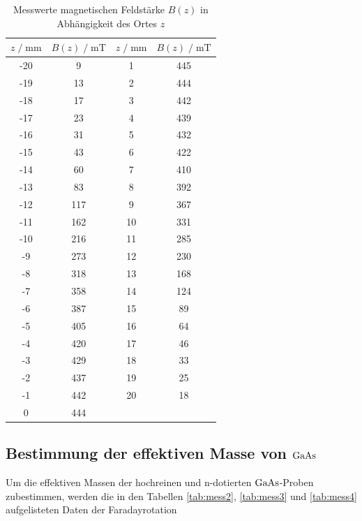 \begin{table}[H]
    \centering
    \caption{Messwerte magnetischen Feldstärke $B(z)$ in Abhängigkeit des Ortes $z$}
    \label{tab:mess1}
    \begin{tabular}{c c c c}
    \toprule
    $z \;/\; \si{\milli\meter}$ & $B(z) \;/\; \si{\milli\tesla}$ & $z \;/\; \si{\milli\meter}$ & $B(z) \;/\; \si{\milli\tesla}$ \\
    \midrule
        -20 &   9 &  1 & 445 \\
        -19 &  13 &  2 & 444 \\
        -18 &  17 &  3 & 442 \\
        -17 &  23 &  4 & 439 \\
        -16 &  31 &  5 & 432 \\
        -15 &  43 &  6 & 422 \\
        -14 &  60 &  7 & 410 \\
        -13 &  83 &  8 & 392 \\
        -12 & 117 &  9 & 367 \\
        -11 & 162 & 10 & 331 \\
        -10 & 216 & 11 & 285 \\
         -9 & 273 & 12 & 230 \\
         -8 & 318 & 13 & 168 \\
         -7 & 358 & 14 & 124 \\
         -6 & 387 & 15 &  89 \\
         -5 & 405 & 16 &  64 \\
         -4 & 420 & 17 &  46 \\
         -3 & 429 & 18 &  33 \\ 
         -2 & 437 & 19 &  25 \\ 
         -1 & 442 & 20 &  18 \\ 
          0 & 444 &    &     \\
    \bottomrule
    \end{tabular}
\end{table}

\subsection{Bestimmung der effektiven Masse von $\ce{GaAs}$}

Um die effektiven Massen der hochreinen und n-dotierten $\ce{GaAs}$-Proben zubestimmen, werden die in den 
Tabellen \ref{tab:mess2}, \ref{tab:mess3} und \ref{tab:mess4} aufgelisteten Daten der Faradayrotation

